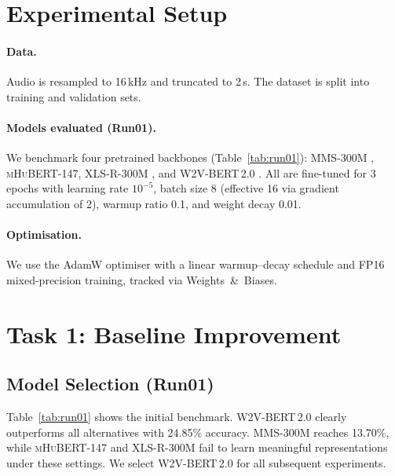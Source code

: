 \documentclass[11pt]{article}
\begin{document}
\section{Experimental Setup}
\label{sec:setup}

\paragraph{Data.}
Audio is resampled to 16\,kHz and truncated to 2\,s.
The dataset is split into training and validation sets.

\paragraph{Models evaluated (Run01).}
We benchmark four pretrained backbones (Table~\ref{tab:run01}):
\textsc{MMS-300M}         \cite{pratap2023scaling},
\textsc{mHuBERT-147},
\textsc{XLS-R-300M}       \cite{babu2021xls},
and \textsc{W2V-BERT\,2.0} \cite{babu2021xls}.
All are fine-tuned for 3 epochs with learning rate $10^{-5}$, batch size 8 (effective 16 via gradient accumulation of 2), warmup ratio 0.1, and weight decay 0.01.

\paragraph{Optimisation.}
We use the AdamW optimiser with a linear warmup–decay schedule \cite{vaswani2017attention, devlin2019bert} and FP16 mixed-precision training, tracked via Weights~\&~Biases.

\section{Task 1: Baseline Improvement}
\label{sec:task1}

\subsection{Model Selection (Run01)}

Table~\ref{tab:run01} shows the initial benchmark.
\textsc{W2V-BERT\,2.0} clearly outperforms all alternatives with 24.85\% accuracy.
\textsc{MMS-300M} reaches 13.70\%, while \textsc{mHuBERT-147} and \textsc{XLS-R-300M} fail to learn meaningful representations under these settings.
We select \textsc{W2V-BERT\,2.0} for all subsequent experiments.
\end{document}
